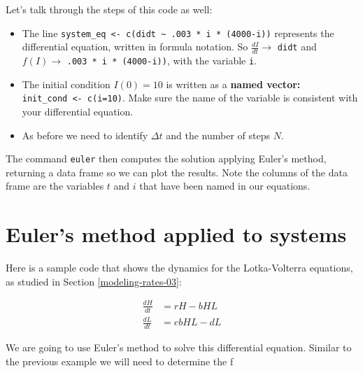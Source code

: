 \documentclass[
]{book}
\providecommand{\tightlist}{%
  \setlength{\itemsep}{0pt}\setlength{\parskip}{0pt}}
\theoremstyle{definition}
\theoremstyle{definition}
\theoremstyle{definition}
\theoremstyle{remark}
\begin{document}
Let's talk through the steps of this code as well:

\begin{itemize}
\tightlist
\item
  The line \texttt{system\_eq\ \textless{}-\ c(didt\ \textasciitilde{}\ .003\ *\ i\ *\ (4000-i))} represents the differential equation, written in formula notation. So \(\displaystyle \frac{dI}{dt} \rightarrow\) \texttt{didt} and \(f(I) \rightarrow\) \texttt{.003\ *\ i\ *\ (4000-i))}, with the variable \texttt{i}.
\item
  The initial condition \(I(0)=10\) is written as a \textbf{named vector:} \texttt{init\_cond\ \textless{}-\ c(i=10)}. Make sure the name of the variable is consistent with your differential equation.
\item
  As before we need to identify \(\Delta t\) and the number of steps \(N\).
\end{itemize}

The command \texttt{euler} then computes the solution applying Euler's method, returning a data frame so we can plot the results. Note the columns of the data frame are the variables \(t\) and \(i\) that have been named in our equations.

\hypertarget{eulers-method-applied-to-systems}{%
\section{Euler's method applied to systems}\label{eulers-method-applied-to-systems}}

Here is a sample code that shows the dynamics for the Lotka-Volterra equations, as studied in Section \ref{modeling-rates-03}:

\begin{equation}
\begin{split} 
\frac{dH}{dt} &= r H - bHL \\  \label{eq:lynx-hare-04}
\frac{dL}{dt} &= e  b  H L - dL
\end{split}
\end{equation}

We are going to use Euler's method to solve this differential equation. Similar to the previous example we will need to determine the f
\end{document}
